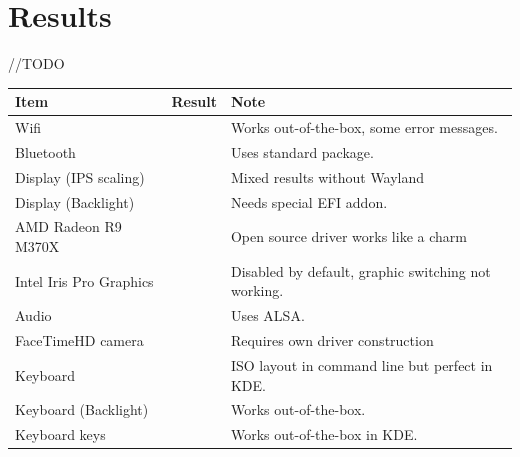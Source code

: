 \section{Results}

\begin{small}
\end{small}

//TODO

\begin{center}
	\begin{tabular}{lcl}
		\rowcolor{white!50}
		\textbf{Item} & \textbf{Result} & \textbf{Note}\\
		\hline\hline
		Wifi\footnotemark[1] & \raisebox{-0.2\height}{\color{green}{\openiconic[]}} & Works out-of-the-box, some error messages.\\
		Bluetooth & \raisebox{-0.2\height}{\color{green}{\openiconic[]}} & Uses standard \code{bluez} package.\\
		Display (IPS scaling)\footnotemark[2] & \raisebox{-0.2\height}{\color{orange}{\openiconic[]}} & Mixed results without Wayland\\
		Display (Backlight) & \raisebox{-0.2\height}{\color{blue}{\openiconic[]}} & Needs special EFI addon.\\
		AMD Radeon R9 M370X & \raisebox{-0.2\height}{\color{green}{\openiconic[]}} & Open source driver works like a charm\\
		Intel Iris Pro Graphics\footnotemark[3] & \raisebox{-0.2\height}{\color{red}{\openiconic[]}} & Disabled by default, graphic switching not working.\\
		Audio & \raisebox{-0.2\height}{\color{green}{\openiconic[]}} & Uses ALSA.\\
		FaceTimeHD camera & \raisebox{-0.2\height}{\color{orange}{\openiconic[]}} & Requires own driver construction\\
		Keyboard & \raisebox{-0.2\height}{\color{green}{\openiconic[]}} & ISO layout in command line but perfect in KDE.\\
		Keyboard (Backlight) & \raisebox{-0.2\height}{\color{green}{\openiconic[]}} & Works out-of-the-box.\\
		Keyboard \fbox{Fn} keys & \raisebox{-0.2\height}{\color{green}{\openiconic[]}} & Works out-of-the-box in KDE.
	\end{tabular}
\end{center}

